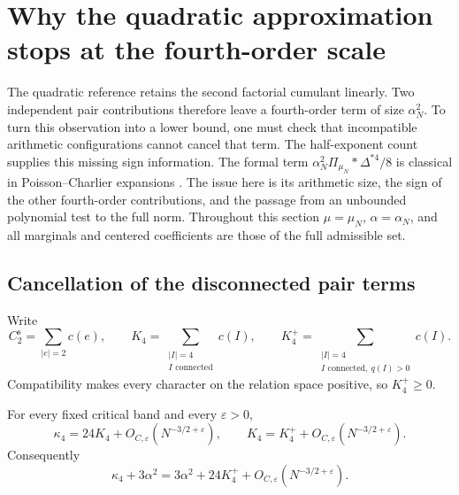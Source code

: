 \section{Why the quadratic approximation stops at the fourth-order scale}
\label{p13:lower:section}

The quadratic reference retains the second factorial cumulant linearly.
Two independent pair contributions therefore leave a fourth-order term of
size $\alpha_N^2$. To turn this observation into a lower bound, one must
check that incompatible arithmetic configurations cannot cancel that term.
The half-exponent count supplies this missing sign information.
The formal term \(\alpha_N^2\Pi_{\mu_N}*\Delta^{*4}/8\)
is classical in Poisson--Charlier expansions
\cite{bkn2014,cekanaviciusvellaisamy2015}. The issue here is its
arithmetic size, the sign of the other fourth-order contributions,
and the passage from an unbounded polynomial test to the full norm.
Throughout this section $\mu=\mu_N$, $\alpha=\alpha_N$, and all marginals
and centered coefficients are those of the full admissible set.

\subsection{Cancellation of the disconnected pair terms}

Write
\[
 C_2^{\mathrm s}=\sum_{|e|=2}c(e),\qquad
 K_4=\sum_{\substack{|I|=4\\I\text{ connected}}}c(I),\qquad
 K_4^+=\sum_{\substack{|I|=4\\I\text{ connected},\ q(I)>0}}c(I).
\]
Compatibility makes every character on the relation space positive, so
$K_4^+\geq0$.

\begin{lemma}
\label{p13:lower:quartic}
For every fixed critical band and every $\varepsilon>0$,
\begin{equation}
 \kappa_4=24K_4+O_{C,\varepsilon}(N^{-3/2+\varepsilon}),\qquad
 K_4=K_4^++O_{C,\varepsilon}(N^{-3/2+\varepsilon}).
 \label{p13:lower:quartic-identities}
\end{equation}
Consequently
\begin{equation}
 \kappa_4+3\alpha^2
 =3\alpha^2+24K_4^++O_{C,\varepsilon}(N^{-3/2+\varepsilon}).
 \label{p13:lower:positive-quartic}
\end{equation}
\end{lemma}

